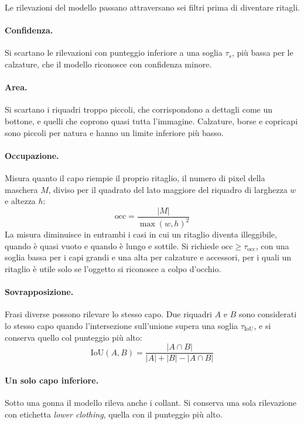 Le rilevazioni del modello passano attraversano sei filtri prima di diventare ritagli.

\paragraph{Confidenza.}
Si scartano le rilevazioni con punteggio inferiore a una soglia $\tau_s$, più bassa per le calzature, che il modello riconosce con confidenza minore.

\paragraph{Area.}
Si scartano i riquadri troppo piccoli, che corrispondono a dettagli come un bottone, e quelli che coprono quasi tutta l'immagine. Calzature, borse e copricapi sono piccoli per natura e hanno un limite inferiore più basso.

\paragraph{Occupazione.}
Misura quanto il capo riempie il proprio ritaglio, il numero di pixel della maschera $M$, diviso per il quadrato del lato maggiore del riquadro di larghezza $w$ e altezza $h$:
\begin{equation}
  \mathrm{occ} = \frac{|M|}{\max(w, h)^{2}}
\end{equation}
La misura diminuisce in entrambi i casi in cui un ritaglio diventa illeggibile, quando è quasi vuoto e quando è lungo e sottile.
Si richiede $\mathrm{occ} \geq \tau_{\mathrm{occ}}$, con una soglia bassa per i capi grandi e una alta per calzature e accessori, per i quali un ritaglio è utile solo se l'oggetto si riconosce a colpo d'occhio.

\paragraph{Sovrapposizione.}
Frasi diverse possono rilevare lo stesso capo. Due riquadri $A$ e $B$ sono considerati lo stesso capo quando l'intersezione sull'unione supera una soglia $\tau_{\mathrm{IoU}}$, e si conserva quello col punteggio più alto:
\begin{equation}
  \mathrm{IoU}(A, B) = \frac{|A \cap B|}{|A| + |B| - |A \cap B|}
\end{equation}

\paragraph{Un solo capo inferiore.}
Sotto una gonna il modello rileva anche i collant. Si conserva una sola rilevazione con etichetta \textit{lower clothing}, quella con il punteggio più alto.

